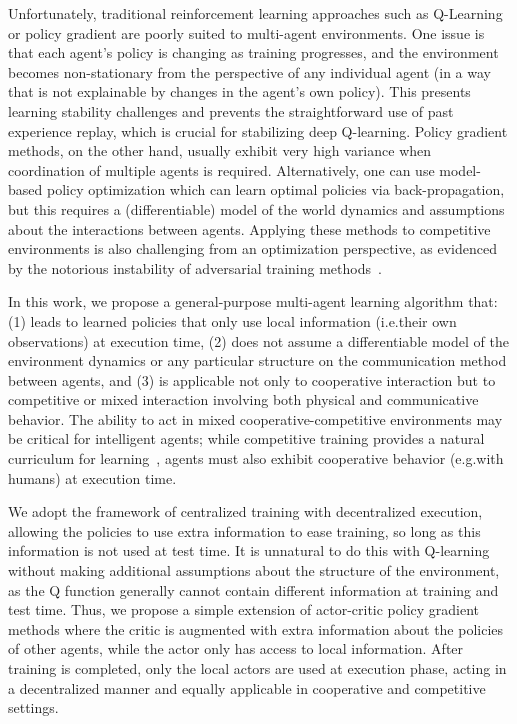 \documentclass{article}
\begin{document}
Unfortunately, traditional reinforcement learning approaches such as Q-Learning or policy gradient are poorly suited to multi-agent environments. One issue is that each agent’s policy is changing as training progresses, and the environment becomes non-stationary from the perspective of any individual agent (in a way that is not explainable by changes in the agent's own policy). This presents learning stability challenges and prevents the straightforward use of past experience replay, which is crucial for stabilizing deep Q-learning. Policy gradient methods, on the other hand, usually exhibit very high variance when coordination of multiple agents is required. Alternatively, one can use model-based policy optimization which can learn optimal policies via back-propagation, but this requires a (differentiable) model of the world dynamics and assumptions about the interactions between agents. Applying these methods to competitive environments is also challenging from an optimization perspective, as evidenced by the notorious instability of adversarial training methods~\cite{goodfellow2014generative}.


In this work, we propose a general-purpose multi-agent learning algorithm that:
(1) leads to learned policies that only use local information (i.e.\@ their own observations) at execution time, (2) does not assume a differentiable model of the environment dynamics or any particular structure on the communication method between agents, and (3) is applicable not only to cooperative interaction but to competitive or mixed interaction involving both physical and communicative behavior. The ability to act in mixed cooperative-competitive environments may be critical for intelligent agents; while competitive training provides a natural curriculum for learning~\cite{sukhbaatar2017intrinsic}, agents must also exhibit cooperative behavior (e.g.\@ with humans) at execution time.

We adopt the framework of centralized training with decentralized execution, allowing the policies to use extra information to ease training, so long as this information is not used at test time. It is unnatural to do this with Q-learning without making additional assumptions about the structure of the environment, as the Q function generally cannot contain different information at training and test time. Thus, we propose a simple extension of actor-critic policy gradient methods where the critic is augmented with extra information about the policies of other agents, while the actor only has access to local information. After training is completed, only the local actors are used at execution phase, acting in a decentralized manner and equally applicable in cooperative and competitive settings.
\end{document}
